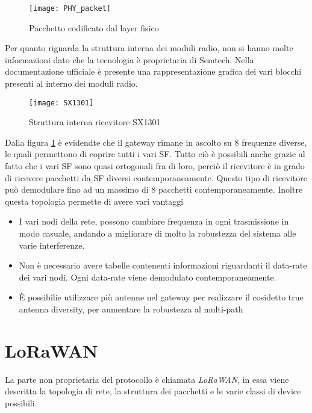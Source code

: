 \begin{figure}[h]
\centering 
\texttt{[image: PHY\_packet]}
\caption{Pacchetto codificato dal layer fisico}
\end{figure}


Per quanto riguarda la struttura interna dei moduli radio, non si hanno molte
informazioni dato che la tecnologia è proprietaria di Semtech. Nella
documentazione ufficiale è presente una rappresentazione grafica dei vari
blocchi presenti al interno dei moduli radio.

\begin{figure}[h]
\centering 
\texttt{[image: SX1301]}
\caption{Struttura interna ricevitore SX1301}
\label{fig:sx1301}
\end{figure}

Dalla figura \ref{fig:sx1301} è evidendte che il gateway rimane in ascolto su 8 
frequenze diverse, le quali permettono di coprire tutti i vari SF. 
Tutto ciò è possibili anche grazie al fatto che i vari SF sono quasi ortogonali 
fra di loro, perciò il ricevitore è in grado di ricevere pacchetti da SF diversi 
contemporaneamente. Questo tipo di ricevitore può demodulare fino ad un massimo 
di 8 pacchetti contemporaneamente. Inoltre questa topologia permette di avere 
vari vantaggi
\begin{itemize}
\item I vari nodi della rete, possono cambiare frequenza in ogni trasmissione in
modo casuale, andando a migliorare di molto la robustezza del sistema alle varie
interferenze.
\item Non è necessario avere tabelle contenenti informazioni riguardanti il
data-rate dei vari nodi. Ogni data-rate viene demodulato contemporaneamente.
\item È possibilie utilizzare più antenne nel gateway per realizzare il
cosidetto true antenna diversity, per aumentare la robustezza al multi-path
\end{itemize}

\section{LoRaWAN}
La parte non proprietaria del protocollo è chiamata \emph{LoRaWAN}, in essa
viene descritta la topologia di rete, la struttura dei pacchetti e le varie
classi di device possibili.


